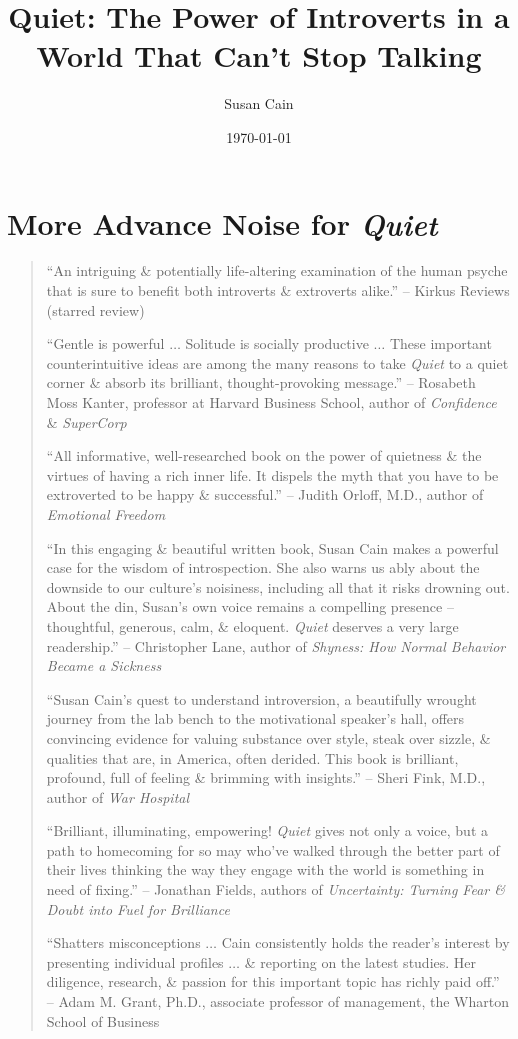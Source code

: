 \documentclass{article}
\title{Quiet: The Power of Introverts in a World That Can't Stop Talking}
\author{Susan Cain}
\date{\today}
\numberwithin{equation}{section}
\begin{document}
\maketitle
\tableofcontents


\section*{More Advance Noise for \textit{Quiet}}

\begin{quotation}
	``An intriguing \& potentially life-altering examination of the human psyche that is sure to benefit both introverts \& extroverts alike.'' -- Kirkus Reviews (starred review)
	
	``Gentle is powerful $\ldots$ Solitude is socially productive $\ldots$ These important counterintuitive ideas are among the many reasons to take \textit{Quiet} to a quiet corner \& absorb its brilliant, thought-provoking message.'' -- Rosabeth Moss Kanter, professor at Harvard Business School, author of \textit{Confidence} \& \textit{SuperCorp}
	
	``All informative, well-researched book on the power of quietness \& the virtues of having a rich inner life. It dispels the myth that you have to be extroverted to be happy \& successful.'' -- Judith Orloff, M.D., author of \textit{Emotional Freedom}
	
	``In this engaging \& beautiful written book, Susan Cain makes a powerful case for the wisdom of introspection. She also warns us ably about the downside to our culture's noisiness, including all that it risks drowning out. About the din, Susan's own voice remains a compelling presence -- thoughtful, generous, calm, \& eloquent. \textit{Quiet} deserves a very large readership.'' -- Christopher Lane, author of \textit{Shyness: How Normal Behavior Became a Sickness}
	
	``Susan Cain's quest to understand introversion, a beautifully wrought journey from the lab bench to the motivational speaker's hall, offers convincing evidence for valuing substance over style, steak over sizzle, \& qualities that are, in America, often derided. This book is brilliant, profound, full of feeling \& brimming with insights.'' -- Sheri Fink, M.D., author of \textit{War Hospital}
	
	``Brilliant, illuminating, empowering! \textit{Quiet} gives not only a voice, but a path to homecoming for so may who've walked through the better part of their lives thinking the way they engage with the world is something in need of fixing.'' -- Jonathan Fields, authors of \textit{Uncertainty: Turning Fear \& Doubt into Fuel for Brilliance}
	
	``Shatters misconceptions $\ldots$ Cain consistently holds the reader's interest by presenting individual profiles $\ldots$ \& reporting on the latest studies. Her diligence, research, \& passion for this important topic has richly paid off.'' -- Adam M. Grant, Ph.D., associate professor of management, the Wharton School of Business
\end{quotation}
\end{document}
